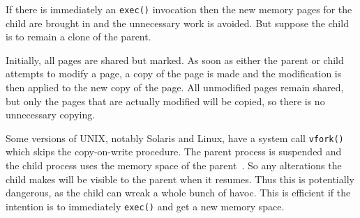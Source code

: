 If there is immediately an \texttt{exec()} invocation then the new memory pages for the child are brought in and the unnecessary work is avoided. But suppose the child is to remain a clone of the parent.

Initially, all pages are shared but marked. As soon as either the parent or child attempts to modify a page, a copy of the page is made and the modification is then applied to the new copy of the page. All unmodified pages remain shared, but only the pages that are actually modified will be copied, so there is no unnecessary copying.

Some versions of UNIX, notably Solaris and Linux, have a system call \texttt{vfork()} which skips the copy-on-write procedure. The parent process is suspended and the child process uses the memory space of the parent~\cite{osc}. So any alterations the child makes will be visible to the parent when it resumes. Thus this is potentially dangerous, as the child can wreak a whole bunch of havoc. This is efficient if the intention is to immediately \texttt{exec()} and get a new memory space.



